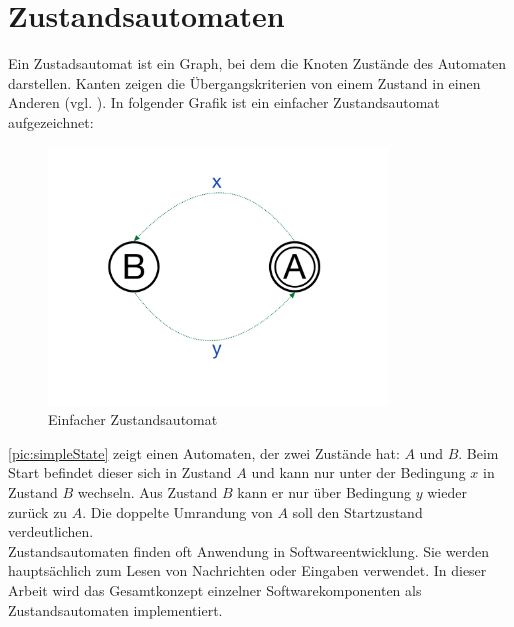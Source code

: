 \section{Zustandsautomaten}
Ein Zustadsautomat ist ein Graph, bei dem die Knoten Zustände des Automaten darstellen. Kanten zeigen die Übergangskriterien von einem Zustand in einen Anderen (vgl. \cite{infoSkript}). In folgender Grafik ist ein einfacher Zustandsautomat aufgezeichnet: 

\begin{figure}[h]
	\begin{center}
		\includegraphics[width=9cm]{simpleState.pdf}
		\caption{\label{pic:simpleState}Einfacher Zustandsautomat}
	\end{center}
\end{figure}

\autoref{pic:simpleState} zeigt einen Automaten, der zwei Zustände hat: $A$ und $B$. Beim Start befindet dieser sich in Zustand $A$ und kann nur unter der Bedingung $x$ in Zustand $B$ wechseln. Aus Zustand $B$ kann er nur über Bedingung $y$ wieder zurück zu $A$. Die doppelte Umrandung von $A$ soll den Startzustand verdeutlichen. \\
Zustandsautomaten finden oft Anwendung in Softwareentwicklung. Sie werden hauptsächlich zum Lesen von Nachrichten oder Eingaben verwendet. In dieser Arbeit wird das Gesamtkonzept einzelner Softwarekomponenten als Zustandsautomaten implementiert.